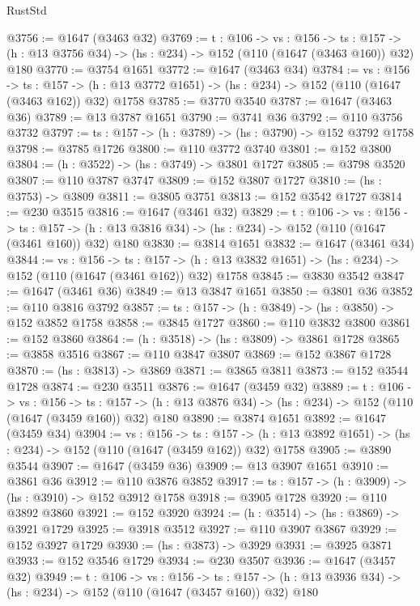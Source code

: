 \begin{lexlean}{RustStd}
\begin{coremodule}
@3756 := @1647 (@3463 @32)
@3769 := {t : @106} ->
  {vs : @156} ->
  {ts : @157} -> (h : @13 @3756 @34) -> (hs : @234) -> @152 (@110 (@1647 (@3463 @160)) @32) @180
@3770 := @3754 @1651
@3772 := @1647 (@3463 @34)
@3784 := {vs : @156} ->
  {ts : @157} -> (h : @13 @3772 @1651) -> (hs : @234) -> @152 (@110 (@1647 (@3463 @162)) @32) @1758
@3785 := @3770 @3540
@3787 := @1647 (@3463 @36)
@3789 := @13 @3787 @1651
@3790 := @3741 @36
@3792 := @110 @3756 @3732
@3797 := {ts : @157} -> (h : @3789) -> (hs : @3790) -> @152 @3792 @1758
@3798 := @3785 @1726
@3800 := @110 @3772 @3740
@3801 := @152 @3800
@3804 := (h : @3522) -> (hs : @3749) -> @3801 @1727
@3805 := @3798 @3520
@3807 := @110 @3787 @3747
@3809 := @152 @3807 @1727
@3810 := (hs : @3753) -> @3809
@3811 := @3805 @3751
@3813 := @152 @3542 @1727
@3814 := @230 @3515
@3816 := @1647 (@3461 @32)
@3829 := {t : @106} ->
  {vs : @156} ->
  {ts : @157} -> (h : @13 @3816 @34) -> (hs : @234) -> @152 (@110 (@1647 (@3461 @160)) @32) @180
@3830 := @3814 @1651
@3832 := @1647 (@3461 @34)
@3844 := {vs : @156} ->
  {ts : @157} -> (h : @13 @3832 @1651) -> (hs : @234) -> @152 (@110 (@1647 (@3461 @162)) @32) @1758
@3845 := @3830 @3542
@3847 := @1647 (@3461 @36)
@3849 := @13 @3847 @1651
@3850 := @3801 @36
@3852 := @110 @3816 @3792
@3857 := {ts : @157} -> (h : @3849) -> (hs : @3850) -> @152 @3852 @1758
@3858 := @3845 @1727
@3860 := @110 @3832 @3800
@3861 := @152 @3860
@3864 := (h : @3518) -> (hs : @3809) -> @3861 @1728
@3865 := @3858 @3516
@3867 := @110 @3847 @3807
@3869 := @152 @3867 @1728
@3870 := (hs : @3813) -> @3869
@3871 := @3865 @3811
@3873 := @152 @3544 @1728
@3874 := @230 @3511
@3876 := @1647 (@3459 @32)
@3889 := {t : @106} ->
  {vs : @156} ->
  {ts : @157} -> (h : @13 @3876 @34) -> (hs : @234) -> @152 (@110 (@1647 (@3459 @160)) @32) @180
@3890 := @3874 @1651
@3892 := @1647 (@3459 @34)
@3904 := {vs : @156} ->
  {ts : @157} -> (h : @13 @3892 @1651) -> (hs : @234) -> @152 (@110 (@1647 (@3459 @162)) @32) @1758
@3905 := @3890 @3544
@3907 := @1647 (@3459 @36)
@3909 := @13 @3907 @1651
@3910 := @3861 @36
@3912 := @110 @3876 @3852
@3917 := {ts : @157} -> (h : @3909) -> (hs : @3910) -> @152 @3912 @1758
@3918 := @3905 @1728
@3920 := @110 @3892 @3860
@3921 := @152 @3920
@3924 := (h : @3514) -> (hs : @3869) -> @3921 @1729
@3925 := @3918 @3512
@3927 := @110 @3907 @3867
@3929 := @152 @3927 @1729
@3930 := (hs : @3873) -> @3929
@3931 := @3925 @3871
@3933 := @152 @3546 @1729
@3934 := @230 @3507
@3936 := @1647 (@3457 @32)
@3949 := {t : @106} ->
  {vs : @156} ->
  {ts : @157} -> (h : @13 @3936 @34) -> (hs : @234) -> @152 (@110 (@1647 (@3457 @160)) @32) @180

\end{coremodule}
\end{lexlean}
